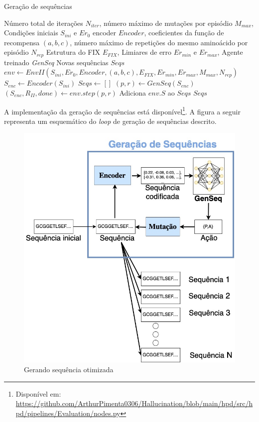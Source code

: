 \begin{algorithm}[H]
  \caption{Geração de sequências}
  \label{alg:gerseq}
  \begin{algorithmic}[1]
  \Require Número total de iterações $N_{iter}$, %
  \State         número máximo de mutações por episódio $M_{max}$, %
  \State         Condições iniciais $S_{ini}$ e $Er_{0}$
  \State         encoder $Encoder$,
  \State         coeficientes da função de recompensa $(a, b, c)$,
  \State         número máximo de repetições do mesmo aminoácido por episódio $N_{rep}$
  \State         Estrutura do FIX $E_{FIX}$, 
  \State         Limiares de erro $Er_{min}$ e $Er_{max}$, %
  \State         Agente treinado \textit{GenSeq}
  \Ensure Novas sequências $Seqs$
  \State $env \gets EnvII(S_{ini}, Er_{0}, Encoder, (a, b, c), E_{FIX}, Er_{min},Er_{max}, M_{max}, N_{rep})$ 
  \State $S_{enc} \gets Encoder(S_{ini})$ 
  \State $Seqs \gets []$ 
      \State $(p,r) \gets GenSeq(S_{enc})$ 
      \State $(S_{enc}, R_{II}, done) \gets env.step(p, r)$ 
      \State Adiciona $env.S$ ao $Seqs$ 
  \EndFor
  \State \Return $Seqs$
  \end{algorithmic}
\end{algorithm}

A implementação da geração de sequências está disponível\footnote{Disponível em: \url{https://github.com/ArthurPimenta0306/Hallucination/blob/main/hpd/src/hpd/pipelines/Evaluation/nodes.py}}.
A figura a seguir representa um esquemático do \textit{loop} de geração de sequências descrito.

\begin{figure}[H]
  \centering
  \includegraphics[width=.8\textwidth]{figuras/metodologia-Generating.jpg}
  \caption{Gerando sequência otimizada}
  \label{fig:geradorseq}
\end{figure}


